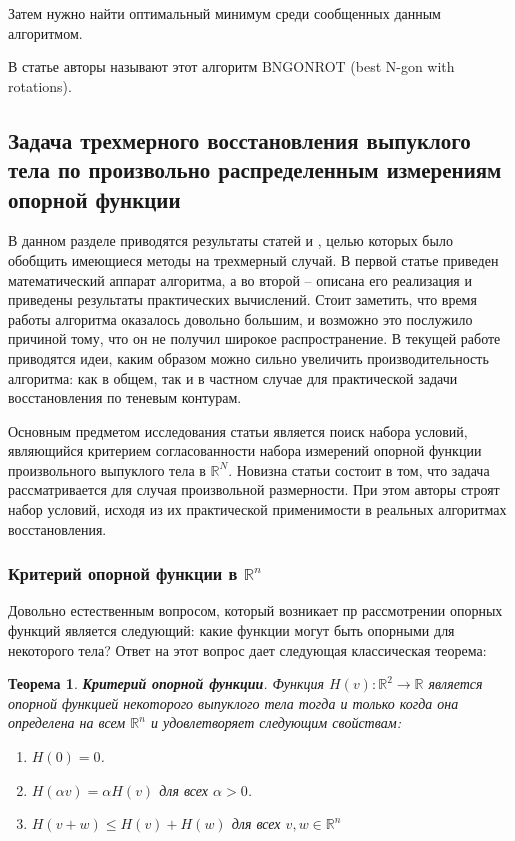 \documentclass[a4paper, 12pt, titlepage]{article}
\theoremstyle{definition}
\theoremstyle{plain}
\newtheorem{SmartTheorem}{Теорема}
\theoremstyle{plain}
\begin{document}
Затем нужно найти оптимальный минимум среди сообщенных данным алгоритмом.

В статье авторы называют этот алгоритм BNGONROT (best N-gon with rotations).

\newpage
\subsection{Задача трехмерного восстановления выпуклого тела по произвольно
распределенным измерениям опорной функции}

В данном разделе приводятся результаты статей \cite{journals/jmiv/KarlKVW96} и
\cite{conf/spie/GregorR2001}, целью которых было обобщить имеющиеся методы на
трехмерный случай. В первой статье приведен математический аппарат алгоритма,
а во второй -- описана его реализация и приведены результаты практических
вычислений. Стоит заметить, что время работы алгоритма оказалось довольно
большим, и возможно это послужило причиной тому, что он не получил широкое
распространение. В текущей работе приводятся идеи, каким образом можно сильно
увеличить производительность алгоритма: как в общем, так и в частном случае
для практической задачи восстановления по теневым контурам.

Основным предметом исследования статьи \cite{journals/jmiv/KarlKVW96} является
поиск набора условий, являющийся критерием согласованности набора измерений
опорной функции произвольного выпуклого тела в $\mathbb{R}^{N}$. Новизна статьи
состоит в том, что задача рассматривается для случая произвольной размерности.
При этом авторы строят набор условий, исходя из их практической применимости в
реальных алгоритмах восстановления.

\subsubsection{Критерий опорной функции в $\mathbb{R}^{n}$}

Довольно естественным вопросом, который возникает пр рассмотрении опорных
функций является следующий: какие функции могут быть опорными для некоторого
тела? Ответ на этот вопрос дает следующая классическая теорема:

\begin{SmartTheorem}
 \label{thm:support-function-criterio-R2}
 \textbf{Критерий опорной функции}.
 Функция $H(v): \mathbb{R}^{2} \to \mathbb{R}$ является опорной функцией
 некоторого выпуклого тела тогда и только когда она определена на всем
 $\mathbb{R}^{n}$ и удовлетворяет следующим свойствам:
 \begin{enumerate}
  \item $H(0) = 0$.
  \item $H(\alpha v) = \alpha H(v)$ для всех $\alpha > 0$.
  \item $H(v + w) \leq H(v) + H(w)$ для всех $v, w \in \mathbb{R}^{n}$
 \end{enumerate}
\end{SmartTheorem}
\end{document}
